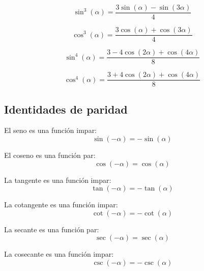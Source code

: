 \begin{proposición}
$$\sin^3(\alpha) = \frac{3\sin(\alpha) - \sin(3\alpha)}{4}$$
\end{proposición}

\begin{proposición}
$$\cos^3(\alpha) = \frac{3\cos(\alpha) + \cos(3\alpha)}{4}$$
\end{proposición}

\begin{proposición}
$$\sin^4(\alpha) = \frac{3 - 4\cos(2\alpha) + \cos(4\alpha)}{8}$$
\end{proposición}

\begin{proposición}
$$\cos^4(\alpha) = \frac{3 + 4\cos(2\alpha) + \cos(4\alpha)}{8}$$
\end{proposición}

\subsection{Identidades de paridad}

\begin{proposición}
El seno es una función impar:
$$\sin(-\alpha) = -\sin(\alpha)$$
\end{proposición}

\begin{proposición}
El coseno es una función par:
$$\cos(-\alpha) = \cos(\alpha)$$
\end{proposición}

\begin{proposición}
La tangente es una función impar:
$$\tan(-\alpha) = -\tan(\alpha)$$
\end{proposición}

\begin{proposición}
La cotangente es una función impar:
$$\cot(-\alpha) = -\cot(\alpha)$$
\end{proposición}

\begin{proposición}
La secante es una función par:
$$\sec(-\alpha) = \sec(\alpha)$$
\end{proposición}

\begin{proposición}
La cosecante es una función impar:
$$\csc(-\alpha) = -\csc(\alpha)$$
\end{proposición}

